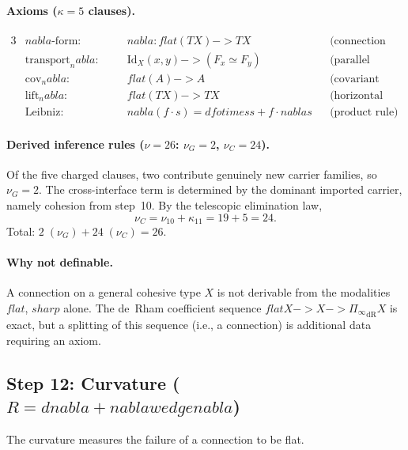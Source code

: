 \documentclass[11pt,a4paper]{article}
\def\to{->}%
\def\otimes{otimes}%
\def\nabla{nabla}%
\def\wedge{wedge}%
\def\flat{flat}%
\def\sharp{sharp}%
\theoremstyle{plain}
\theoremstyle{definition}
\theoremstyle{remark}
\begin{document}
\paragraph{Axioms ($\kappa = 5$ clauses).}
\begin{alignat*}{3}
    &\nabla\text{-form:}        &\quad& \nabla : \flat(TX) \to TX
        && \text{(connection operator)} \\
    &\mathrm{transport}_\nabla\text{:} && \mathrm{Id}_X(x, y) \to (F_x \simeq F_y)
        && \text{(parallel transport)} \\
    &\mathrm{cov}_\nabla\text{:}       && \flat(A) \to A
        && \text{(covariant derivative)} \\
    &\mathrm{lift}_\nabla\text{:}      && \flat(TX) \to TX
        && \text{(horizontal lift)} \\
    &\mathrm{Leibniz}\text{:}          && \nabla(f \cdot s) = df \otimes s + f \cdot \nabla s
        && \text{(product rule)}
\end{alignat*}

\paragraph{Derived inference rules ($\nu = 26$: $\nu_G = 2$, $\nu_C = 24$).}
Of the five charged clauses, two contribute genuinely new carrier families, so $\nu_G = 2$.
The cross-interface term is determined by the dominant imported carrier, namely cohesion from step~10. By the telescopic elimination law,
\[
  \nu_C = \nu_{10} + \kappa_{11} = 19 + 5 = 24.
\]
Total: $2\;(\nu_G) + 24\;(\nu_C) = 26$.

\paragraph{Why not definable.}
A connection on a general cohesive type $X$ is not derivable from the modalities $\flat$, $\sharp$ alone.
The de~Rham coefficient sequence $\flat X \to X \to {\Pi_{\!\infty}}_{\mathrm{dR}} X$ is exact, but a splitting of this sequence (i.e., a connection) is additional data requiring an axiom.

\subsection{\texorpdfstring{Step 12: Curvature ($R = d\nabla + \nabla \wedge \nabla$)}{Step 12: Curvature (R = d nabla + nabla wedge nabla)}}
\label{app:curvature-spec}

The curvature measures the failure of a connection to be flat.
\end{document}
